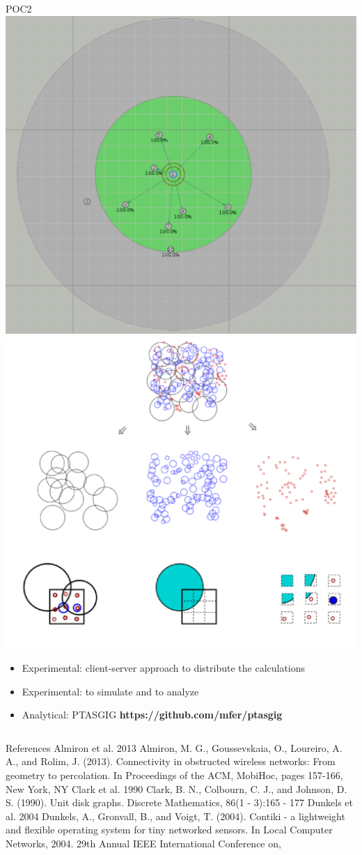 \documentclass[final,hyperref={pdfpagelabels=false}]{beamer}
\begin{document}
\begin{frame}{}
\begin{columns}[t]
\begin{column}{.48\linewidth}
\begin{block}{POC2}
          \includegraphics[width=0.35\linewidth]{cooja} 
          \includegraphics[width=0.47\linewidth]{ptasgig} 
          \begin{itemize}
          \item Experimental: client-server approach to distribute the calculations
          \item Experimental: to simulate and to analyze
          \item Analytical: PTASGIG {\bf https://github.com/mfer/ptasgig}
          \end{itemize}  
        \end{block}
      \end{column}
    \end{columns}
    \begin{block}{\footnotesize References}
      \scriptsize
      {\normalsize Almiron et al. 2013} Almiron, M. G., Goussevskaia, O., Loureiro, A. A., 
        and Rolim, J. (2013). Connectivity in obstructed wireless networks: From geometry to 
        percolation. In Proceedings of the ACM, MobiHoc, pages 157-166, New York, NY \newline
      {\normalsize Clark et al. 1990} Clark, B. N., Colbourn, C. J., and Johnson, D. S. (1990). 
        Unit disk graphs. Discrete Mathematics, 86(1 - 3):165 - 177\newline
      {\normalsize Dunkels et al. 2004} Dunkels, A., Gronvall, B., and Voigt, T. (2004). 
        Contiki - a lightweight and flexible operating system for tiny networked sensors. 
        In Local Computer Networks, 2004. 29th Annual IEEE International Conference on, 

\end{block}
\end{frame}
\end{document}
